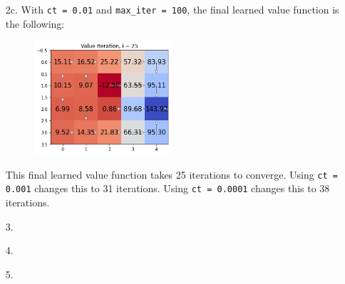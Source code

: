 \documentclass[submit]{harvardml}
\begin{document}
\begin{itemize}
    \item[2c.]
    With \texttt{ct = 0.01} and \texttt{max\_iter = 100}, the final learned value function is the 
    following:
    \begin{figure}[H]
        \centering
        \includegraphics[width=0.48\textwidth]{hw6_2c}
    \end{figure}
    This final learned value function takes 25 iterations to converge. Using 
    \texttt{ct = 0.001} changes this to 31 iterations.
    Using \texttt{ct = 0.0001} changes this to 38 iterations.
    
    \item[3.]
    \item[4.]
    \item[5.]       
\end{itemize}
\end{document}
